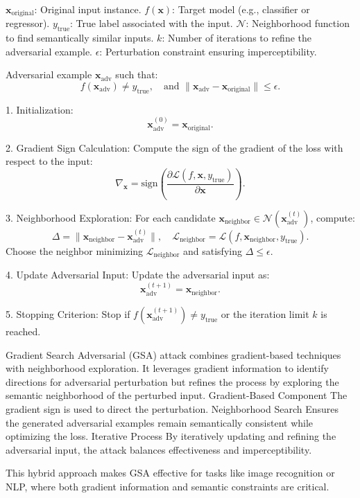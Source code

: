 $\mathbf{x}_{\text{original}}$: Original input instance.  
$f(\mathbf{x})$: Target model (e.g., classifier or regressor).  
$y_{\text{true}}$: True label associated with the input.  
$\mathcal{N}$: Neighborhood function to find semantically similar inputs.  
$k$: Number of iterations to refine the adversarial example.  
$\epsilon$: Perturbation constraint ensuring imperceptibility.

Adversarial example $\mathbf{x}_{\text{adv}}$ such that:  
\[ 
f(\mathbf{x}_{\text{adv}}) \neq y_{\text{true}}, \quad \text{and } \|\mathbf{x}_{\text{adv}} - \mathbf{x}_{\text{original}}\| \leq \epsilon.
\]

1. Initialization:  
   \[
   \mathbf{x}_{\text{adv}}^{(0)} = \mathbf{x}_{\text{original}}.
   \]

2. Gradient Sign Calculation:  
   Compute the sign of the gradient of the loss with respect to the input:  
   \[
   \nabla_{\mathbf{x}} = \text{sign}\left(\frac{\partial \mathcal{L}(f, \mathbf{x}, y_{\text{true}})}{\partial \mathbf{x}}\right).
   \]

3. Neighborhood Exploration:  
   For each candidate $\mathbf{x}_{\text{neighbor}} \in \mathcal{N}(\mathbf{x}_{\text{adv}}^{(t)})$, compute:  
   \[
   \Delta = \|\mathbf{x}_{\text{neighbor}} - \mathbf{x}_{\text{adv}}^{(t)}\|, \quad \mathcal{L}_{\text{neighbor}} = \mathcal{L}(f, \mathbf{x}_{\text{neighbor}}, y_{\text{true}}).
   \]
   Choose the neighbor minimizing $\mathcal{L}_{\text{neighbor}}$ and satisfying $\Delta \leq \epsilon$.

4. Update Adversarial Input:  
   Update the adversarial input as:  
   \[
   \mathbf{x}_{\text{adv}}^{(t+1)} = \mathbf{x}_{\text{neighbor}}.
   \]

5. Stopping Criterion:  
   Stop if $f(\mathbf{x}_{\text{adv}}^{(t+1)}) \neq y_{\text{true}}$ or the iteration limit $k$ is reached.

Gradient Search Adversarial (GSA) attack combines gradient-based techniques with neighborhood exploration. It leverages gradient information to identify directions for adversarial perturbation but refines the process by exploring the semantic neighborhood of the perturbed input.  
Gradient-Based Component The gradient sign is used to direct the perturbation.  
Neighborhood Search Ensures the generated adversarial examples remain semantically consistent while optimizing the loss.  
Iterative Process By iteratively updating and refining the adversarial input, the attack balances effectiveness and imperceptibility.  

This hybrid approach makes GSA effective for tasks like image recognition or NLP, where both gradient information and semantic constraints are critical.
